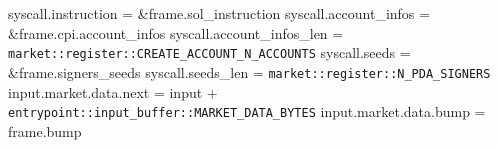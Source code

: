 \begin{algorithm}
\begin{algorithmic}
  \STATE syscall.instruction = \&frame.sol\_instruction
  \STATE syscall.account\_infos = \&frame.cpi.account\_infos
  \STATE syscall.account\_infos\_len =
    \texttt{market::register::CREATE\_ACCOUNT\_N\_ACCOUNTS}
  \STATE syscall.seeds = \&frame.signers\_seeds
  \STATE syscall.seeds\_len = \texttt{market::register::N\_PDA\_SIGNERS}
  \STATE {}
  \STATE input.market.data.next = input + \texttt{entrypoint::input\_buffer::MARKET\_DATA\_BYTES}
  \STATE input.market.data.bump = frame.bump
\ENDPROCEDURE
\end{algorithmic}
\end{algorithm}
